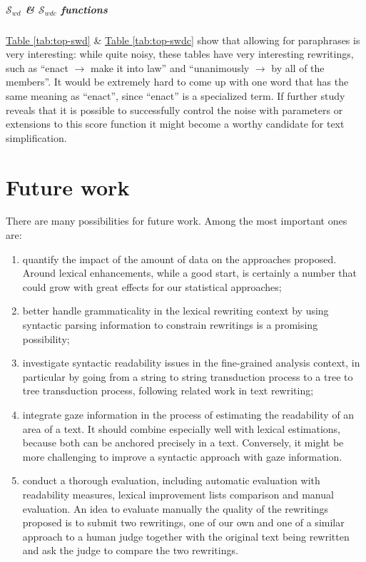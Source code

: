 \documentclass[a4paper, 11pt, onepage]{scrreprt}
\newcommand\tableref[1]{\hyperref[#1]{Table \ref*{#1}}}
\begin{document}
\paragraph*{$\mathcal{S}_{wd}$ \& $\mathcal{S}_{wdc}$ functions}
\label{par:swd}

\tableref{tab:top-swd} \& \tableref{tab:top-swdc} show that
allowing for paraphrases is very interesting: while quite noisy, these
tables have very interesting rewritings, such as “enact $\rightarrow$
make it into law” and “unanimously $\rightarrow$ by all of the
members”. It would be extremely hard to come up with one word that has
the same meaning as “enact”, since “enact” is a specialized term. If
further study reveals that it is possible to successfully control the
noise with parameters or extensions to this score function it might
become a worthy candidate for text simplification.

\chapter{Future work}
\label{cha:future-work}

There are many possibilities for future work. Among the most important
ones are:

\begin{enumerate}
\item quantify the impact of the amount of data on the approaches
  proposed. Around  lexical enhancements, while a good
  start, is certainly a number that could grow with great effects for
  our statistical approaches;
\item better handle grammaticality in the lexical rewriting context by
  using syntactic parsing information to constrain rewritings is a
  promising possibility;
\item investigate syntactic readability issues in the fine-grained
  analysis context, in particular by going from a string to string
  transduction process to a tree to tree transduction process,
  following related work in text rewriting;
\item integrate gaze information in the process of estimating the
  readability of an area of a text. It should combine especially well
  with lexical estimations, because both can be anchored precisely in
  a text. Conversely, it might be more challenging to improve a
  syntactic approach with gaze information.
\item conduct a thorough evaluation, including automatic evaluation
  with readability measures, lexical improvement lists comparison and
  manual evaluation. An idea to evaluate manually the quality of the
  rewritings proposed is to submit two rewritings, one of our own and
  one of a similar approach to a human judge together with the
  original text being rewritten and ask the judge to compare the two
  rewritings.
\end{enumerate}
\end{document}
